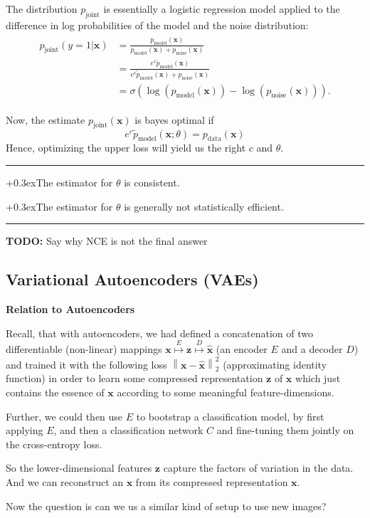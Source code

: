 \documentclass[a2paper,8pt]{extarticle}
\newcommand{\norm}[1]{\left\lVert #1 \right\rVert}
\renewcommand{\vec}[1]{\mathbf{#1}}
\newcommand{\vx}{\vec{x}}
\newcommand{\vz}{\vec{z}}
\newcommand{\vhx}{\widehat{\vec{x}}}
\newcommand{\todo}[1]{\textbf{TODO:} #1}
\newcommand{\todo}[1]{%
}
\newcommand{\customboxpaddingsize}{0pt}
\newcommand{\emptyarg}[1][]{\ifthenelse{\isempty{#1}}{}{\ (#1)}}
\newcommand{\Thm}[1][]{{\setlength\fboxsep{\customboxpaddingsize}
\colorbox{thmcolor}{%
\color{custtitlecolor}{\textbf{T.\emptyarg[#1]}}}\kern+0.3ex}}
\newcommand{\sep}{\vspace{0pt}\noindent\hrule\vspace{0pt}}
\newcommand{\sep}{\vspace{5pt}\noindent\hrule\vspace{5pt}}
\begin{document}
\begin{landscape}
\begin{multicols*}{7}
The distribution $p_{\text{joint}}$ is essentially a logistic regression model
applied to the difference in log probabilities of the model and the noise
distribution:
\begin{gather*}
\begin{align*}
p_{\text{joint}}(y=1|\vx)
&=\frac{p_{\text{model}}(\vx)}{p_{\text{model}}(\vx)+p_{\text{noise}}(\vx)}
\\
&=\frac{e^c\tilde{p}_{\text{model}}(\vx)}{
e^c\tilde{p}_{\text{model}}(\vx)+p_{\text{noise}}(\vx)}
\\
&=\sigma(\log(p_{\text{model}}(\vx))-\log(p_{\text{noise}}(\vx))).
\end{align*}
\end{gather*}

Now, the estimate $p_{\text{joint}}(\vx)$ is bayes optimal if
\[
e^c\tilde{p}_{\text{model}}(\vx;\theta)=p_{\text{data}}(\vx)
\]
Hence, optimizing the upper loss will yield us the right $c$ and $\theta$.
\sep

\Thm The estimator for $\theta$ is consistent.

\Thm The estimator for $\theta$ is generally not statistically efficient.

\sep

\todo{Say why NCE is not the final answer}

\subsection{Variational Autoencoders (VAEs)}

\textbf{Relation to Autoencoders}

Recall, that with autoencoders, we had defined a concatenation of two
differentiable (non-linear) mappings
$\vx\stackrel{E}{\mapsto}\vz\stackrel{D}{\mapsto}\vhx$ (an encoder $E$ and a
decoder $D$) and trained it with the following loss $\norm{\vx-\vhx}_2^2$
(approximating identity function) in order to learn some compressed
representation $\vz$ of $\vx$ which just contains the essence of $\vx$ according
to some meaningful feature-dimensions.

Further, we could then use $E$ to bootstrap a classification model, by first
applying $E$, and then a classification network $C$ and fine-tuning them jointly
on the cross-entropy loss.

So the lower-dimensional features $\vz$ capture the factors of variation in
the data. And we can reconstruct an $\vx$ from its compressed representation
$\vx$.

Now the question is can we us a similar kind of setup to use new images?


\end{multicols*}
\end{landscape}
\end{document}
